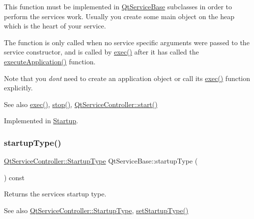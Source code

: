 This function must be implemented in \mbox{\hyperlink{class_qt_service_base}{Qt\+Service\+Base}} subclasses in order to perform the service\textquotesingle{}s work. Usually you create some main object on the heap which is the heart of your service.

The function is only called when no service specific arguments were passed to the service constructor, and is called by \mbox{\hyperlink{class_qt_service_base_afae2e589de71c1ae3ae8db3dc9ab9c64}{exec()}} after it has called the \mbox{\hyperlink{class_qt_service_base_ab70633cd29a22758dfa0502b77e564f6}{execute\+Application()}} function.

Note that you {\itshape don\textquotesingle{}t} need to create an application object or call its \mbox{\hyperlink{class_qt_service_base_afae2e589de71c1ae3ae8db3dc9ab9c64}{exec()}} function explicitly.

\begin{DoxySeeAlso}{See also}
\mbox{\hyperlink{class_qt_service_base_afae2e589de71c1ae3ae8db3dc9ab9c64}{exec()}}, \mbox{\hyperlink{class_qt_service_base_a8d52c1b8fd06b50bdc0a0c6f9936a68e}{stop()}}, \mbox{\hyperlink{class_qt_service_controller_a5e9d6da5081d70f31611456d0ef0687e}{Qt\+Service\+Controller\+::start()}} 
\end{DoxySeeAlso}


Implemented in \mbox{\hyperlink{class_startup_abdcf9eed41611ee15a59ed00dc2fc2d8}{Startup}}.

\mbox{\label{class_qt_service_base_aa1b3bf9b7fc09777b422f49f7bcfbcbe}} 
\subsubsection{\texorpdfstring{startup\+Type()}{startupType()}}
{\footnotesize\ttfamily \mbox{\hyperlink{class_qt_service_controller_a946ac2b079d9760503da923c2eaf0aac}{Qt\+Service\+Controller\+::\+Startup\+Type}} Qt\+Service\+Base\+::startup\+Type (\begin{DoxyParamCaption}{ }\end{DoxyParamCaption}) const}

Returns the service\textquotesingle{}s startup type.

\begin{DoxySeeAlso}{See also}
\mbox{\hyperlink{class_qt_service_controller_a946ac2b079d9760503da923c2eaf0aac}{Qt\+Service\+Controller\+::\+Startup\+Type}}, \mbox{\hyperlink{class_qt_service_base_a6beddd54c973c3a7d81075b2f3f80df2}{set\+Startup\+Type()}} 
\end{DoxySeeAlso}


